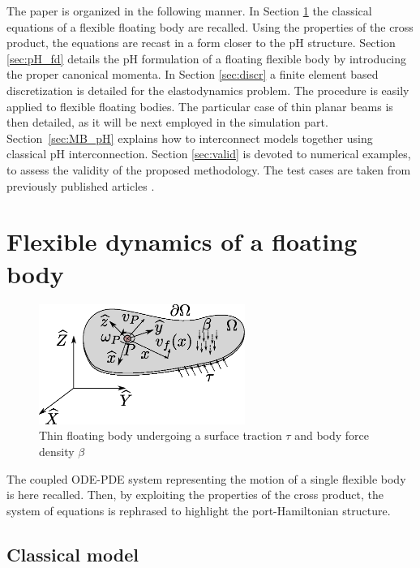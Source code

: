 \documentclass{svjour3}                     %
\begin{document}
\indent The paper is organized in the following manner. In Section \ref{sec:class_model} the classical equations of a flexible floating body are recalled. Using the properties of the cross product, the equations are recast in a form closer to the pH structure. Section \ref{sec:pH_fd} details the pH formulation of a floating flexible body by introducing the proper canonical momenta. In Section \ref{sec:discr} a finite element based discretization is detailed for the elastodynamics problem. The procedure is easily applied to flexible floating bodies. The particular case of thin planar beams is then detailed, as it will be next employed in the simulation part. Section~\ref{sec:MB_pH} explains how to interconnect models together using classical pH interconnection. Section \ref{sec:valid} is devoted to numerical examples, to assess the validity of the proposed methodology. The test cases are taken from previously published articles \cite{Chebbi2017,Ellenbroek2018}.

 

\section{Flexible dynamics of a floating body}
\label{sec:class_model}

\begin{figure}[t]
	\centering
	\includegraphics[width=0.6\textwidth]{floating_body.eps} 
	\caption{Thin floating body undergoing a surface traction $\tau$ and body force density $\beta$}
	\label{fig:float_body}
\end{figure}
The coupled ODE-PDE system representing the motion of a single flexible body is here recalled. Then, by exploiting the properties of the cross product, the system of equations is rephrased to highlight the port-Hamiltonian structure.

\subsection{Classical model}
\end{document}
